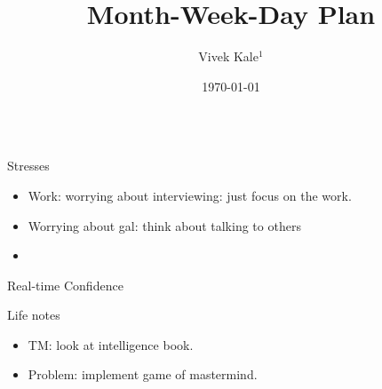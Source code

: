 \documentclass[serif, mathserif, final]{beamer}
\title{Month-Week-Day Plan}
\author{Vivek Kale$^1$}
\institute{$^1$ University of Illinois at Urbana-Champaign}
\date{\today}
\begin{document}
    
\begin{frame}
  \begin{columns}
    \begin{column}{0.25\linewidth} %

      \begin{block}{Stresses}
        \begin{itemize}
        \item \tiny Work: worrying about interviewing: just
          focus on the work. 
        \item \tiny Worrying about gal: think about talking to
          others 
        \item \tiny 
        \end{itemize}
      \end{block}

      \begin{block}{Real-time Confidence}
      \end{block}
      \begin{block}{Life notes}
        \begin{itemize}
        \item \tiny TM: look at intelligence book. 
        \item \tiny Problem: implement game of mastermind. 
        \end{itemize}
      \end{block}
    \end{column} %


\end{columns}
\end{frame}
\end{document}
